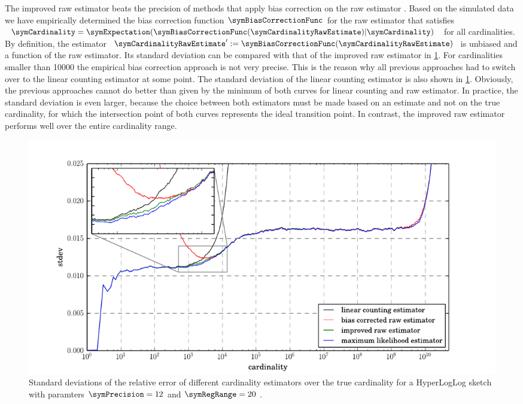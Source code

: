\documentclass[a4paper]{scrartcl}
\begin{document}
The improved raw estimator beats the precision of methods that apply bias correction on the raw estimator \cite{Heule2013,Rhodes2015,Sanfilippo2014}.
Based on the simulated data we have empirically determined the bias correction function $\symBiasCorrectionFunc$ for the raw estimator that satisfies $\symCardinality = \symExpectation(\symBiasCorrectionFunc(\symCardinalityRawEstimate)\vert\symCardinality)$ for all cardinalities. By definition, 
the estimator $\symCardinalityRawEstimate':=\symBiasCorrectionFunc(\symCardinalityRawEstimate)$ is unbiased and a function of the raw estimator. Its standard deviation can be compared with that of the improved raw estimator in \cref{fig:stdev_comparison}. For cardinalities smaller than \num{10000} the empirical bias correction approach is not very precise. This is the reason why all previous approaches had to switch over to the linear counting estimator at some point. The standard deviation of the linear counting estimator is also shown in \cref{fig:stdev_comparison}. Obviously, the previous approaches cannot do better than given by the minimum of both curves for linear counting and raw estimator. In practice, the standard deviation is even larger, because the choice between both estimators must be made based on an estimate and not on the true cardinality, for which the intersection point of both curves represents the ideal transition point. In contrast, the improved raw estimator performs well over the entire cardinality range.

\begin{figure}
\centering
\includegraphics[width=1\textwidth]{stdev_comparison}
\caption{Standard deviations of the relative error of different cardinality estimators over the true cardinality for a HyperLogLog sketch with paramters $\symPrecision = 12$ and $\symRegRange=20$ .}
\label{fig:stdev_comparison}
\end{figure}
\end{document}
